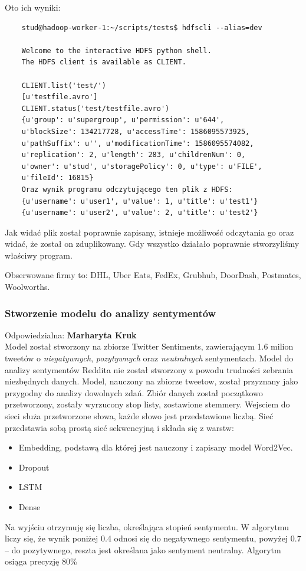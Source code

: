 \documentclass[a4paper,11pt, notitlepage ]{article}
\begin{document}
    Oto ich wyniki:
    \begin{verbatim}
    stud@hadoop-worker-1:~/scripts/tests$ hdfscli --alias=dev

    Welcome to the interactive HDFS python shell.
    The HDFS client is available as CLIENT.

    CLIENT.list('test/')
    [u'testfile.avro']
    CLIENT.status('test/testfile.avro')
    {u'group': u'supergroup', u'permission': u'644', 
    u'blockSize': 134217728, u'accessTime': 1586095573925, 
    u'pathSuffix': u'', u'modificationTime': 1586095574082, 
    u'replication': 2, u'length': 283, u'childrenNum': 0, 
    u'owner': u'stud', u'storagePolicy': 0, u'type': u'FILE', 
    u'fileId': 16815}
    Oraz wynik programu odczytującego ten plik z HDFS:
    {u'username': u'user1', u'value': 1, u'title': u'test1'}
    {u'username': u'user2', u'value': 2, u'title': u'test2'}
    \end{verbatim}

    Jak widać plik został poprawnie zapisany, istnieje możliwość odczytania go oraz widać, że został on zduplikowany.
    Gdy wszystko działało poprawnie stworzyliśmy właściwy program.

    Obserwowane firmy to: DHL, Uber Eats, FedEx, Grubhub, DoorDash, Postmates, Woolworths.

    \subsubsection{Stworzenie modelu do analizy sentymentów} 
    Odpowiedzialna: \textbf{Marharyta Kruk} \\

    Model został stworzony na zbiorze Twitter Sentiments, zawierającym 1.6 milion tweetów o \textit{niegatywnych}, \textit{pozytywnych} oraz \textit{neutralnych} sentymentach. Model do analizy sentymentów Reddita nie został stworzony z powodu trudności zebrania niezbędnych danych. Model, nauczony na zbiorze tweetow, został przyznany jako przygodny do analizy dowolnych zdań.
    Zbiór danych został początkowo przetworzony, zostały wyrzucony stop listy, zostawione stemmery.
    Wejsciem do sieci służa przetworzone słowa, każde słowo jest przedstawione liczbą.
    Sieć przedstawia sobą prostą sieć sekwencyjną i składa się z warstw:
    \begin{itemize}
    \item Embedding, podstawą dla której jest nauczony i zapisany model Word2Vec.
    \item Dropout
    \item LSTM
    \item Dense
    \end{itemize}
    Na wyjściu otrzymuję się liczba, określająca stopień sentymentu. W algorytmu liczy się, że wynik poniżej 0.4 odnosi się do negatywnego sentymentu, powyżej 0.7 – do pozytywnego, reszta jest określana jako sentyment neutralny.
    Algorytm osiąga precyzję 80\%
        
\end{document}
